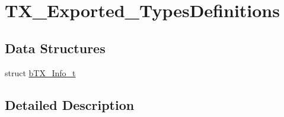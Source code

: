 \hypertarget{group___t_x___exported___types_definitions}{}\section{T\+X\+\_\+\+Exported\+\_\+\+Types\+Definitions}
\label{group___t_x___exported___types_definitions}
\subsection*{Data Structures}
\begin{DoxyCompactItemize}
\item 
struct \mbox{\hyperlink{structb_t_x___info__t}{b\+T\+X\+\_\+\+Info\+\_\+t}}
\end{DoxyCompactItemize}


\subsection{Detailed Description}
